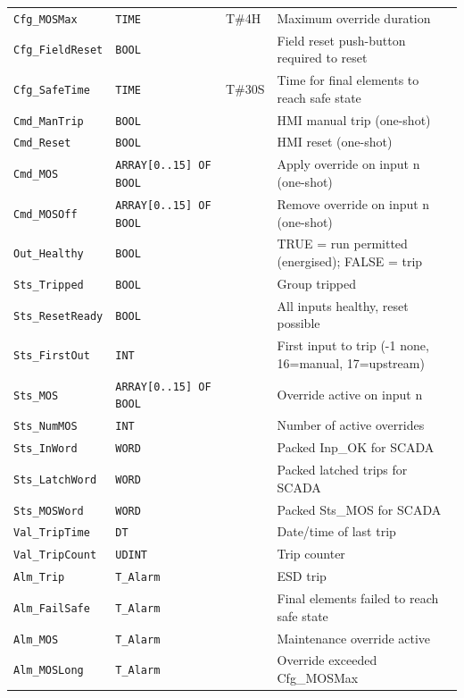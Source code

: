 \begin{small}
\begin{longtable}{@{}P{3.70cm}P{2.20cm}P{1.70cm}P{8.91cm}@{}}
\texttt{Cfg\_MOSMax} & \texttt{TIME} & T\#4H & Maximum override duration \\
\texttt{Cfg\_FieldReset} & \texttt{BOOL} &  & Field reset push-button required to reset \\
\texttt{Cfg\_SafeTime} & \texttt{TIME} & T\#30S & Time for final elements to reach safe state \\
\texttt{Cmd\_ManTrip} & \texttt{BOOL} &  & HMI manual trip (one-shot) \\
\texttt{Cmd\_Reset} & \texttt{BOOL} &  & HMI reset (one-shot) \\
\texttt{Cmd\_MOS} & \texttt{ARRAY[0..15] OF BOOL} &  & Apply override on input n (one-shot) \\
\texttt{Cmd\_MOSOff} & \texttt{ARRAY[0..15] OF BOOL} &  & Remove override on input n (one-shot) \\
\texttt{Out\_Healthy} & \texttt{BOOL} &  & TRUE = run permitted (energised); FALSE = trip \\
\texttt{Sts\_Tripped} & \texttt{BOOL} &  & Group tripped \\
\texttt{Sts\_ResetReady} & \texttt{BOOL} &  & All inputs healthy, reset possible \\
\texttt{Sts\_FirstOut} & \texttt{INT} &  & First input to trip (-1 none, 16=manual, 17=upstream) \\
\texttt{Sts\_MOS} & \texttt{ARRAY[0..15] OF BOOL} &  & Override active on input n \\
\texttt{Sts\_NumMOS} & \texttt{INT} &  & Number of active overrides \\
\texttt{Sts\_InWord} & \texttt{WORD} &  & Packed Inp\_OK for SCADA \\
\texttt{Sts\_LatchWord} & \texttt{WORD} &  & Packed latched trips for SCADA \\
\texttt{Sts\_MOSWord} & \texttt{WORD} &  & Packed Sts\_MOS for SCADA \\
\texttt{Val\_TripTime} & \texttt{DT} &  & Date/\allowbreak{}time of last trip \\
\texttt{Val\_TripCount} & \texttt{UDINT} &  & Trip counter \\
\texttt{Alm\_Trip} & \texttt{T\_Alarm} &  & ESD trip \\
\texttt{Alm\_FailSafe} & \texttt{T\_Alarm} &  & Final elements failed to reach safe state \\
\texttt{Alm\_MOS} & \texttt{T\_Alarm} &  & Maintenance override active \\
\texttt{Alm\_MOSLong} & \texttt{T\_Alarm} &  & Override exceeded Cfg\_MOSMax \\
\bottomrule
\end{longtable}
\end{small}

